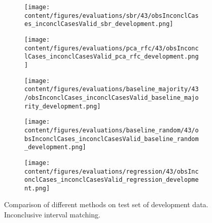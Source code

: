 \begin{figure}[t]
  \begin{subfigure}{0.5\textwidth}
    \centering
    \texttt{[image: content/figures/evaluations/sbr/43/obsInconclCases\_inconclCasesValid\_sbr\_development.png]}
  \end{subfigure}
  \hfill
  \begin{subfigure}{0.5\textwidth}
    \centering
    \texttt{[image: content/figures/evaluations/pca\_rfc/43/obsInconclCases\_inconclCasesValid\_pca\_rfc\_development.png]}
  \end{subfigure}
  \hfill
  \begin{subfigure}{0.5\textwidth}
    \centering
    \texttt{[image: content/figures/evaluations/baseline\_majority/43/obsInconclCases\_inconclCasesValid\_baseline\_majority\_development.png]}
  \end{subfigure}
  \hfill
  \begin{subfigure}{0.5\textwidth}
    \centering
    \texttt{[image: content/figures/evaluations/baseline\_random/43/obsInconclCases\_inconclCasesValid\_baseline\_random\_development.png]}
  \end{subfigure}
  \hfill
  \begin{subfigure}{0.5\textwidth}
    \centering
    \texttt{[image: content/figures/evaluations/regression/43/obsInconclCases\_inconclCasesValid\_regression\_development.png]}
  \end{subfigure}

  \caption{Comparison of different methods on test set of development data. Inconclusive interval matching.}
  \label{fig:test_interval_match_dev}
\end{figure}

